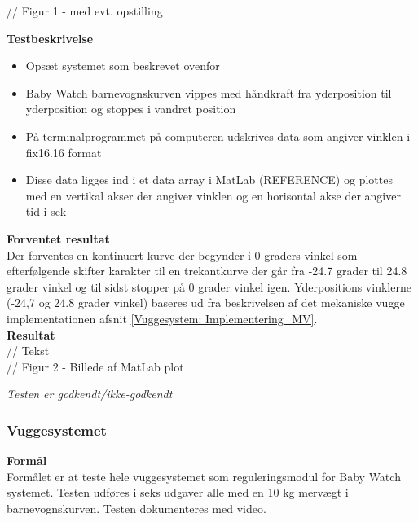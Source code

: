 // Figur 1 - med evt. opstilling

\textbf{Testbeskrivelse}
\begin{itemize}
\item Opsæt systemet som beskrevet ovenfor
\item Baby Watch barnevognskurven vippes med håndkraft fra yderposition til yderposition og stoppes i vandret position
\item På terminalprogrammet på computeren udskrives data som angiver vinklen i fix16.16 format
\item Disse data ligges ind i et data array i MatLab (REFERENCE) og plottes med en vertikal akser der angiver vinklen og en horisontal akse der angiver tid i sek
\end{itemize}

\textbf{Forventet resultat} \\
Der forventes en kontinuert kurve der begynder i 0 graders vinkel som efterfølgende skifter karakter til en trekantkurve der går fra -24.7 grader til 24.8 grader vinkel og til sidst stopper på 0 grader vinkel igen. Yderpositions vinklerne (-24,7 og 24.8 grader vinkel) baseres ud fra beskrivelsen af det mekaniske vugge implementationen afsnit  \ref{Vuggesystem: Implementering_MV}.
  \\
\textbf{Resultat} \\
// Tekst \\

// Figur 2 - Billede af MatLab plot

\textit{Testen er godkendt/ikke-godkendt}

\subsubsection{Vuggesystemet}
\textbf{Formål} \\
Formålet er at teste hele vuggesystemet som reguleringsmodul for Baby Watch systemet. Testen udføres i seks udgaver alle med en 10 kg mervægt i barnevognskurven. Testen dokumenteres med video.

